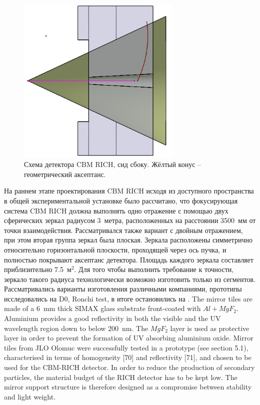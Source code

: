 \begin{figure}[H]
\centering
\includegraphics[width=0.7\textwidth]{pictures/RICH_construction.png}
\caption{Схема детектора CBM RICH, сид сбоку. Жёлтый конус -- геометрический аксептанс.}
\label{fig:RICHconstruction}
\end{figure}

На раннем этапе проектирования CBM RICH исходя из доступного пространства в общей экспериментальной установке было рассчитано, что фокусирующая система CBM RICH должна выполнять одно отражение с помощью двух сферических зеркал радиусом 3~метра, расположенных на расстоянии 3500~мм от точки взаимодействия. Рассматривался также вариант с двойным отражением, при этом вторая группа зеркал была плоская. Зеркала расположены симметрично относительно горизонтальной плоскости, проходящей через ось пучка, и полностью покрывают аксептанс детектора. Площадь каждого зеркала составляет приблизительно 7.5~м$^2$.
Для того чтобы выполнить требование к точности, зеркало такого радиуса технологически возможно изготовить только из сегментов. Рассматривались варианты изготовления различными компаниями, прототипы исследовались на \todo D0, Ronchi test, в итоге остановились на \todo.
The mirror tiles are made of a 6~mm thick SIMAX glass substrate front-coated with $Al+MgF_{2}$. Aluminium provides a good reflectivity in both the visible and the UV wavelength region down to below 200~nm. The $MgF_{2}$ layer is used as protective layer in order to prevent the formation of UV absorbing aluminium oxide. Mirror tiles from JLO Olomuc were successfully tested in a prototype (see section 5.1), characterised in terms of homogeneity [70] and reflectivity [71], and chosen to be used for the CBM-RICH detector.
In order to reduce the production of secondary particles, the material budget of the RICH detector has to be kept low. The mirror support structure is therefore designed as a compromise between stability and light weight.

